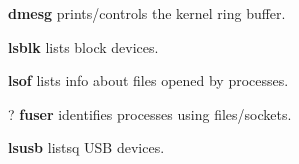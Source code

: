 \begin{compactenum}
\item [\cmdutil] \textbf{dmesg} prints/controls the kernel ring buffer.
\item [\cmdutil] \textbf{lsblk} lists block devices.
\item [\cmdvar] \textbf{lsof} lists info about files opened by processes.
\item [?] \textbf{fuser} identifies processes using files/sockets.
\item [\cmdvar] \textbf{lsusb} listsq USB devices.
\end{compactenum}